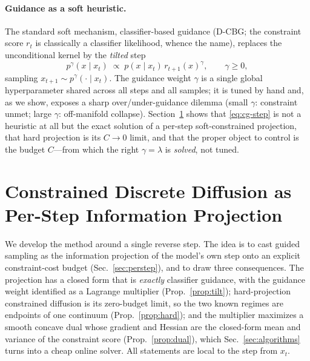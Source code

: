 \documentclass{article}
\begin{document}
\paragraph{Guidance as a soft heuristic.} The standard soft mechanism, classifier-based guidance (D-CBG; the constraint score $r_t$ is classically a classifier likelihood, whence the name), replaces the unconditional kernel by the \emph{tilted} step
\begin{equation}
\label{eq:cg-step}
p^{\gamma}(x\mid x_t)\;\propto\;p(x\mid x_t)\,r_{t+1}(x)^{\gamma},
\qquad \gamma\ge 0,
\end{equation}
sampling $x_{t+1}\sim p^\gamma(\cdot\mid x_t)$. The guidance weight $\gamma$ is a single global hyperparameter shared across all steps and all samples; it is tuned by hand and, as we show, exposes a sharp over/under-guidance dilemma (small $\gamma$: constraint unmet; large $\gamma$: off-manifold collapse). Section~\ref{sec:method} shows that \eqref{eq:cg-step} is not a heuristic at all but the exact solution of a per-step soft-constrained projection, that hard projection is its $C\to0$ limit, and that the proper object to control is the budget $C$---from which the right $\gamma=\lambda$ is \emph{solved}, not tuned.

\section{Constrained Discrete Diffusion as Per-Step Information Projection}
\label{sec:method}

We develop the method around a single reverse step. The idea is to cast guided sampling as the information projection of the model's own step onto an explicit constraint-cost budget (Sec.~\ref{sec:perstep}), and to draw three consequences. The projection has a closed form that is \emph{exactly} classifier guidance, with the guidance weight identified as a Lagrange multiplier (Prop.~\ref{prop:tilt}); hard-projection constrained diffusion is its zero-budget limit, so the two known regimes are endpoints of one continuum (Prop.~\ref{prop:hard}); and the multiplier maximizes a smooth concave dual whose gradient and Hessian are the closed-form mean and variance of the constraint score (Prop.~\ref{prop:dual}), which Sec.~\ref{sec:algorithms} turns into a cheap online solver. All statements are local to the step from $x_t$.
\end{document}
